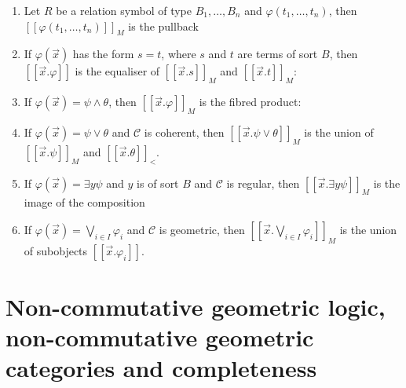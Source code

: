 \documentclass[a4paper]{article}
\theoremstyle{defin}
\theoremstyle{theorem}
\theoremstyle{claim}
\theoremstyle{prop}
\theoremstyle{lemma}
\theoremstyle{fact}
\theoremstyle{ex}
\theoremstyle{col}
\begin{document}
\begin{enumerate}
\item Let $R$ be a relation symbol of type $B_1, \dots, B_n$ and $\varphi(t_1, \dots, t_n)$, then $[[\varphi(t_1, \dots, t_n)]]_M$ is the pullback

\centerline{
}

\item If $\varphi(\vec{x})$ has the form $s = t$, where $s$ and $t$ are terms of sort $B$, then $[[\vec{x}.\varphi]]$ is the equaliser of $[[\vec{x}.s]]_M$ and $[[\vec{x}.t]]_M$:

\centerline{
}

\item If $\varphi(\vec{x}) = \psi \land \theta$, then $[[\vec{x}. \varphi]]_M$ is the fibred product:

\centerline{
}

\item If $\varphi(\vec{x}) = \psi \lor \theta$ and $\mathcal{C}$ is coherent, then $[[\vec{x}. \psi \lor \theta]]_M$ is the union of $[[\vec{x}. \psi]]_M$ and $[[\vec{x}. \theta]]_<$.

\item If $\varphi(\vec{x}) = \exists y \psi$ and $y$ is of sort $B$ and $\mathcal{C}$ is regular, then $[[\vec{x}. \exists y \psi]]_M$ is the image of the composition

\centerline{
}

\item If $\varphi(\vec{x}) = \bigvee \limits_{i \in I} \varphi_i$ and $\mathcal{C}$ is geometric, then $[[\vec{x}. \bigvee \limits_{i \in I} \varphi_i]]_M$ is the union of subobjects $[[\vec{x}. \varphi_i]]$.
\end{enumerate}

\section{Non-commutative geometric logic, non-commutative geometric categories and completeness}
\end{document}
